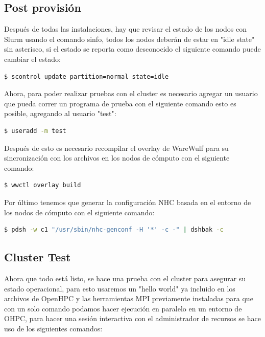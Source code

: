 \subsection{Post provisión}
Después de todas las instalaciones, hay que revisar el estado de los nodos con Slurm usando el comando sinfo, todos los nodos deberán de estar en "idle state" sin asterisco, si el estado se reporta como desconocido el siguiente comando puede cambiar el estado:

\begin{lstlisting}[language=bash, caption={Comando para cambiar el estado de un nodo a "idle"}]
$ scontrol update partition=normal state=idle
\end{lstlisting}

Ahora, para poder realizar pruebas con el cluster es necesario agregar un usuario que pueda correr un programa de prueba con el siguiente comando esto es posible, agregando al usuario "test":

\begin{lstlisting}[language=bash, caption={Comando para agregar un usuario de prueba}]
$ useradd -m test
\end{lstlisting}

Después de esto es necesario recompilar el overlay de WareWulf para su sincronización con los archivos en los nodos de cómputo con el siguiente comando:

\begin{lstlisting}[language=bash, caption={Comando para actualizar los archivos de los nodos de cómputo}]
$ wwctl overlay build
\end{lstlisting}

Por último tenemos que generar la configuración NHC basada en el entorno de los nodos de cómputo con el siguiente comando:

\begin{lstlisting}[language=bash, caption={Comando para crear la configuración de NHC}]
$ pdsh -w c1 "/usr/sbin/nhc-genconf -H '*' -c -" | dshbak -c
\end{lstlisting}

\subsection{Cluster Test}
Ahora que todo está listo, se hace una prueba con el cluster para asegurar su estado operacional, para esto usaremos un "hello world" ya incluido en los archivos de OpenHPC y las herramientas MPI previamente instaladas para que con un solo comando podamos hacer ejecución en paralelo en un entorno de OHPC, para hacer una sesión interactiva con el administrador de recursos se hace uso de los siguientes comandos:

